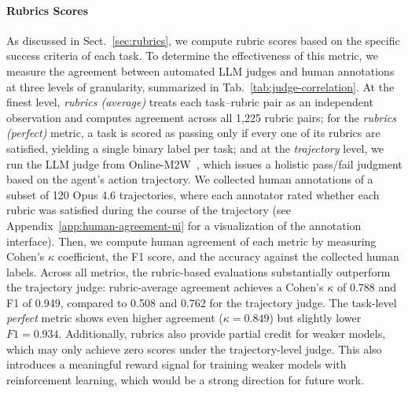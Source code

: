 \documentclass{article}
\theoremstyle{plain}
\theoremstyle{definition}
\theoremstyle{remark}
\begin{document}
\paragraph{Rubrics Scores} As discussed in Sect.~\ref{sec:rubrics}, we compute rubric scores based on the specific success criteria of each task. To determine the effectiveness of this metric, we measure the agreement between automated LLM judges and human annotations at three levels of granularity, summarized in Tab.~\ref{tab:judge-correlation}. At the finest level, \textit{rubrics (average)} treats each task--rubric pair as an independent observation and computes agreement across all 1,225 rubric pairs; for the \textit{rubrics (perfect)} metric, a task is scored as passing only if every one of its rubrics are satisfied, yielding a single binary label per task; and at the \textit{trajectory} level, we run the LLM judge from Online-M2W~\citep{xue2025illusion}, which issues a holistic pass/fail judgment based on the agent's action trajectory.
We collected human annotations of a subset of 120 Opus 4.6 trajectories, where each annotator rated whether each rubric was satisfied during the course of the trajectory (see Appendix~\ref{app:human-agreement-ui} for a visualization of the annotation interface). Then, we compute human agreement of each metric by measuring Cohen's $\kappa$ coefficient, the F1 score, and the accuracy against the collected human labels.
Across all metrics, the rubric-based evaluations substantially outperform the trajectory judge: rubric-average agreement achieves a Cohen's $\kappa$ of 0.788 and F1 of 0.949, compared to 0.508 and 0.762 for the trajectory judge. The task-level \emph{perfect} metric shows even higher agreement ($\kappa = 0.849$) but slightly lower $F1 = 0.934$.
Additionally, rubrics also provide partial credit for weaker models, which may only achieve zero scores under the trajectory-level judge.
This also introduces a meaningful reward signal for training weaker models with reinforcement learning, which would be a strong direction for future work.
\end{document}
